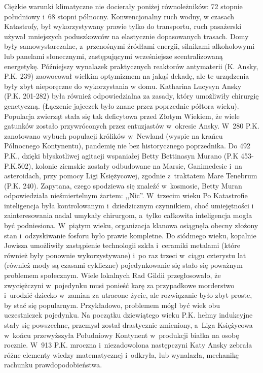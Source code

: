 \documentclass[oneside,polish,12pt,sfheadings]{mwbk}
\begin{document}
Ciężkie warunki klimatyczne nie docierały poniżej równoleżników: 72
stopnie południowy i~68 stopni północny. Konwencjonalny ruch wodny,
w czasach Katastrofy, był wykorzystywany prawie tylko do transportu,
ruch pasażerski używał mniejszych poduszkowców na elastycznie dopasowanych
trasach. Domy były samowystarczalne, z~przenośnymi źródłami energii,
silnikami alkoholowymi lub panelami słonecznymi, zastępującymi wcześniejsze
scentralizowaną energetykę. Późniejszy wynalazek praktycznych reaktorów
antymaterii (K. Ansky, P.K. 239) zaowocował wielkim optymizmem na jakąś
dekadę, ale te urządzenia były zbyt nieporęczne do wykorzystania w
domu. Katharina Lucysyn Ansky (P.K. 201-282) była również odpowiedzialna
za zasady, który umożliwiły chirurgię genetyczną. (Łączenie jajeczek
było znane przez poprzednie półtora wieku). Populacja zwierząt stała
się tak deficytowa przed Złotym Wiekiem, że wiele gatunków zostało
przywróconych przez entuzjastów w~okresie Ansky. W~280 P.K. zanotowano
wybuch populacji królików w~Newland (wyspie na krańcu Północnego Kontynentu),
pandemię nie bez historycznego poprzednika. Do 492 P.K., dzięki błyskotliwej
agitacji wspaniałej Betty Bettinasyn Murano (P.K 453-P.K.502), kolonie
ziemskie zostały odbudowane na Marsie, Ganimedesie i~na asteroidach,
przy pomocy Ligi Księżycowej, zgodnie z~traktatem Mare Tenebrum (P.K.
240). Zapytana, czego spodziewa się znaleźć w~kosmosie, Betty Muran
odpowiedziała nieśmiertelnym żartem: ,,Nic''. W~trzecim wieku Po Katastrofie
inteligencja była kontrolowanym i~dziedzicznym czynnikiem, choć umiejętności
i zainteresowania nadal umykały chirurgom, a~tylko całkowita inteligencja
mogła być podniesiona. W~piątym wieku, organizacja klanowa osiągnęła
obecny złożony stan i~odzyskiwanie fosforu było prawie kompletne.
Do siódmego wieku, kopalnie Jowisza umożliwiły zastąpienie technologii
szkła i~ceramiki metalami (które również były ponownie wykorzystywane)
i~po raz trzeci w~ciągu czterystu lat (również mody są czasami cykliczne)
pojedynkowanie się stało się poważnym problemem społecznym. Wiele
lokalnych Rad Gildii przegłosowało, że zwyciężczyni w~pojedynku musi
ponieść karę za przypadkowe morderstwo i~urodzić dziecko w~zamian
za utracone życie, ale rozwiązanie było zbyt proste, by stać się popularnym.
Przykładowo, problemem mógł być wiek obu uczestniczek pojedynku. Na
początku dziewiątego wieku P.K. hełmy indukcyjne stały się powszechne,
przemysł został drastycznie zmieniony, a~Liga Księżycowa w~końcu przewyższyła
Południowy Kontynent w~produkcji białka na osobę rocznie. W~913 P.K.
mroczna i~niezadowolona następczyni Katy Ansky zebrała różne elementy
wiedzy matematycznej i~odkryła, lub wynalazła, mechanikę rachunku
prawdopodobieństwa.
\end{document}

